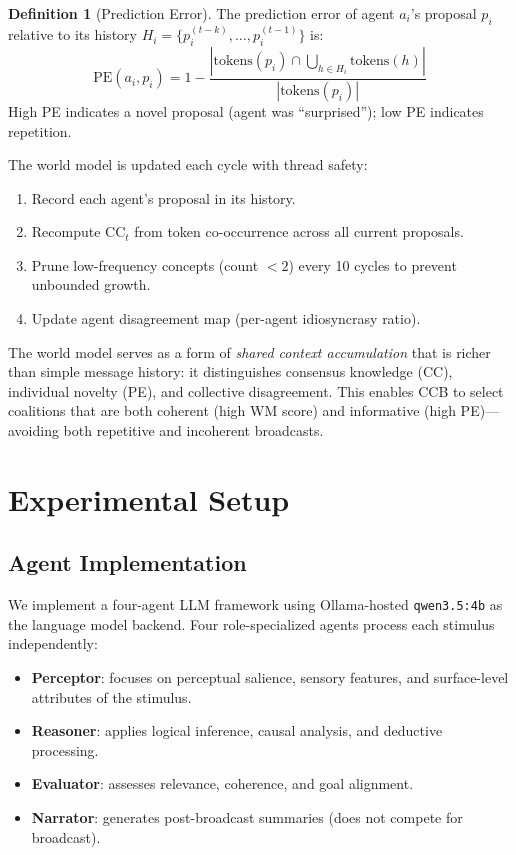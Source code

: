 \documentclass[11pt]{article}
\theoremstyle{definition}
\newtheorem{definition}{Definition}
\begin{document}
\begin{definition}[Prediction Error]
\label{def:pe}
The prediction error of agent $a_i$'s proposal $p_i$ relative to its history $H_i = \{p_i^{(t-k)}, \ldots, p_i^{(t-1)}\}$ is:
\begin{equation}
\text{PE}(a_i, p_i) = 1 - \frac{|\text{tokens}(p_i) \cap \bigcup_{h \in H_i} \text{tokens}(h)|}
  {|\text{tokens}(p_i)|}
\end{equation}
High PE indicates a novel proposal (agent was ``surprised''); low PE indicates repetition.
\end{definition}

The world model is updated each cycle with thread safety:
\begin{enumerate}[noitemsep]
\item Record each agent's proposal in its history.
\item Recompute $\text{CC}_t$ from token co-occurrence across all current proposals.
\item Prune low-frequency concepts (count $< 2$) every 10 cycles to prevent unbounded growth.
\item Update agent disagreement map (per-agent idiosyncrasy ratio).
\end{enumerate}

The world model serves as a form of \emph{shared context accumulation} that is richer than
simple message history: it distinguishes consensus knowledge (CC), individual novelty (PE),
and collective disagreement. This enables CCB to select coalitions that are both coherent
(high WM score) and informative (high PE)---avoiding both repetitive and incoherent broadcasts.


\section{Experimental Setup}
\label{sec:experiments}

\subsection{Agent Implementation}

We implement a four-agent LLM framework using Ollama-hosted \texttt{qwen3.5:4b} as the
language model backend. Four role-specialized agents process each stimulus independently:

\begin{itemize}[noitemsep]
\item \textbf{Perceptor}: focuses on perceptual salience, sensory features, and surface-level
  attributes of the stimulus.
\item \textbf{Reasoner}: applies logical inference, causal analysis, and deductive processing.
\item \textbf{Evaluator}: assesses relevance, coherence, and goal alignment.
\item \textbf{Narrator}: generates post-broadcast summaries (does not compete for broadcast).
\end{itemize}
\end{document}
